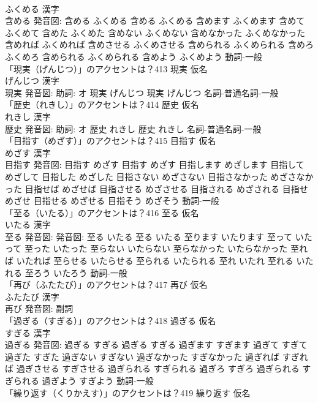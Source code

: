 \documentclass[8pt]{extreport}
\begin{document}
\begin{CJK}{UTF8}{min}
\\	ふくめる 漢字　
\\	含める 発音図:	含める ふくめる		含める ふくめる 含めます ふくめます 含めて ふくめて 含めた ふくめた 含めない ふくめない 含めなかった ふくめなかった 含めれば ふくめれば 含めさせる ふくめさせる 含められる ふくめられる 含めろ ふくめろ 含められる ふくめられる 含めよう ふくめよう				動詞-一般 
\\	「現実（げんじつ）」のアクセントは？413	現実 仮名　
\\	げんじつ 漢字　
\\	現実 発音図: 助詞: オ	現実 げんじつ		現実 げんじつ				名詞-普通名詞-一般 
\\	「歴史（れきし）」のアクセントは？414	歴史 仮名　
\\	れきし 漢字　
\\	歴史 発音図: 助詞: オ	歴史 れきし		歴史 れきし				名詞-普通名詞-一般 
\\	「目指す（めざす）」のアクセントは？415	目指す 仮名　
\\	めざす 漢字　
\\	目指す 発音図:	目指す めざす		目指す めざす 目指します めざします 目指して めざして 目指した めざした 目指さない めざさない 目指さなかった めざさなかった 目指せば めざせば 目指させる めざさせる 目指される めざされる 目指せ めざせ 目指せる めざせる 目指そう めざそう				動詞-一般 
\\	「至る（いたる）」のアクセントは？416	至る 仮名　
\\	いたる 漢字　
\\	至る 発音図: 発音図:	至る いたる		至る いたる 至ります いたります 至って いたって 至った いたった 至らない いたらない 至らなかった いたらなかった 至れば いたれば 至らせる いたらせる 至られる いたられる 至れ いたれ 至れる いたれる 至ろう いたろう				動詞-一般 
\\	「再び（ふたたび）」のアクセントは？417	再び 仮名　
\\	ふたたび 漢字　
\\	再び 発音図:							副詞 
\\	「過ぎる（すぎる）」のアクセントは？418	過ぎる 仮名　
\\	すぎる 漢字　
\\	過ぎる 発音図:	過ぎる すぎる		過ぎる すぎる 過ぎます すぎます 過ぎて すぎて 過ぎた すぎた 過ぎない すぎない 過ぎなかった すぎなかった 過ぎれば すぎれば 過ぎさせる すぎさせる 過ぎられる すぎられる 過ぎろ すぎろ 過ぎられる すぎられる 過ぎよう すぎよう				動詞-一般 
\\	「繰り返す（くりかえす）」のアクセントは？419	繰り返す 仮名　

\end{CJK}
\end{document}
